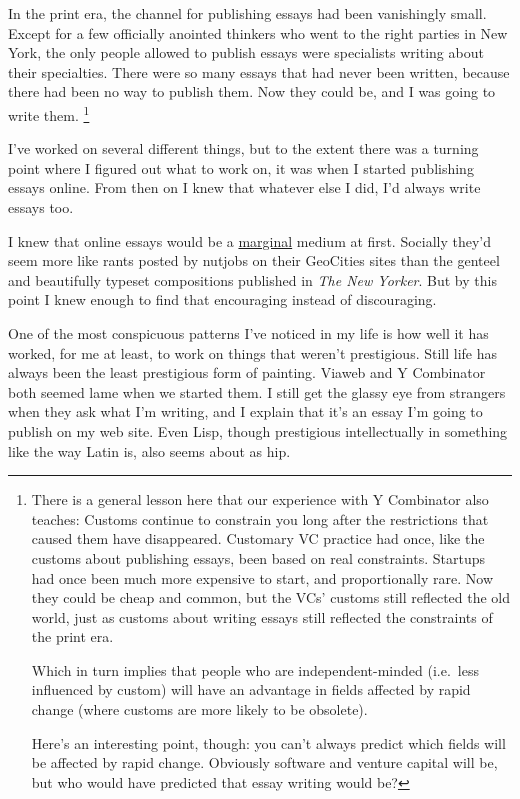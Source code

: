 \documentclass[12pt]{book}
\begin{document}
In the print era, the channel for publishing essays had been vanishingly
small. Except for a few officially anointed thinkers who went to the
right parties in New York, the only people allowed to publish essays
were specialists writing about their specialties. There were so many
essays that had never been written, because there had been no way to
publish them. Now they could be, and I was going to write them.
\footnote{There is a general lesson here that our experience with Y
Combinator also teaches: Customs continue to constrain you long after
the restrictions that caused them have disappeared. Customary VC
practice had once, like the customs about publishing essays, been based
on real constraints. Startups had once been much more expensive to
start, and proportionally rare. Now they could be cheap and common, but
the VCs' customs still reflected the old world, just as customs about
writing essays still reflected the constraints of the print era.

Which in turn implies that people who are independent-minded (i.e.~less
influenced by custom) will have an advantage in fields affected by rapid
change (where customs are more likely to be obsolete).

Here's an interesting point, though: you can't always predict which
fields will be affected by rapid change. Obviously software and venture
capital will be, but who would have predicted that essay writing would
be?}

I've worked on several different things, but to the extent there was a
turning point where I figured out what to work on, it was when I started
publishing essays online. From then on I knew that whatever else I did,
I'd always write essays too.

I knew that online essays would be a \href{marginal.html}{marginal}
medium at first. Socially they'd seem more like rants posted by nutjobs
on their GeoCities sites than the genteel and beautifully typeset
compositions published in \emph{The New Yorker}. But by this point I
knew enough to find that encouraging instead of discouraging.

One of the most conspicuous patterns I've noticed in my life is how well
it has worked, for me at least, to work on things that weren't
prestigious. Still life has always been the least prestigious form of
painting. Viaweb and Y Combinator both seemed lame when we started them.
I still get the glassy eye from strangers when they ask what I'm
writing, and I explain that it's an essay I'm going to publish on my web
site. Even Lisp, though prestigious intellectually in something like the
way Latin is, also seems about as hip.
\end{document}
